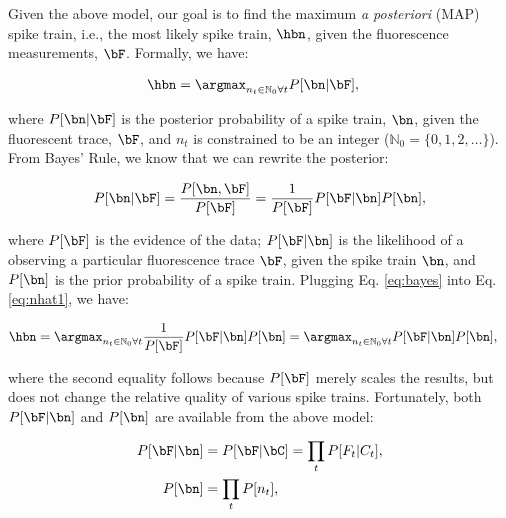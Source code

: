 Given the above model, our goal is to find the maximum \emph{a posteriori} (MAP) spike train, i.e., the most likely spike train, $\hbn$,  given the fluorescence measurements, $\bF$. Formally, we have:

\begin{align} \label{eq:nhat1} 
\hbn &=  \anx P[\bn | \bF], %
\end{align}

\noindent where $P[\bn | \bF]$ is the posterior probability of a spike train, $\bn$, given the fluorescent trace, $\bF$, and $n_t$ is constrained to be an integer ($\mathbb{N}_0=\{0,1,2,\ldots\}$).  From Bayes' Rule, we know that we can rewrite the posterior:

\begin{align} \label{eq:bayes}
P[\bn | \bF] = \frac{P[\bn, \bF]}{P[\bF]} = \frac{1}{P[\bF]} P[\bF | \bn] P[\bn],
\end{align}

\noindent where $P[\bF]$ is the evidence of the data; $P[\bF | \bn]$ is the likelihood of a observing a particular fluorescence trace $\bF$, given the spike train $\bn$, and $P[\bn]$ is the prior probability of a spike train.  Plugging Eq. \eqref{eq:bayes} into Eq. \eqref{eq:nhat1}, we have:

\begin{align} \label{eq:nhat2} 
\hbn &=  \anx \frac{1}{P[\bF]} P[\bF | \bn] P[\bn] =  \anx  P[\bF | \bn] P[\bn],
\end{align}

\noindent where the second equality follows because $P[\bF]$ merely scales the results, but does not change the relative quality of various spike trains. %
Fortunately, both $P[\bF | \bn]$ and $P[\bn]$ are available from the above model:

\begin{subequations} \label{eq:post1}
\begin{align}
P[\bF | \bn]&= P[\bF | \bC] 	= \prod_t P[F_t | C_t], \label{eq:lik1} \\ %
P[\bn] 		&= \prod_t P[n_t], \label{eq:prior1}%
\end{align}
\end{subequations}


